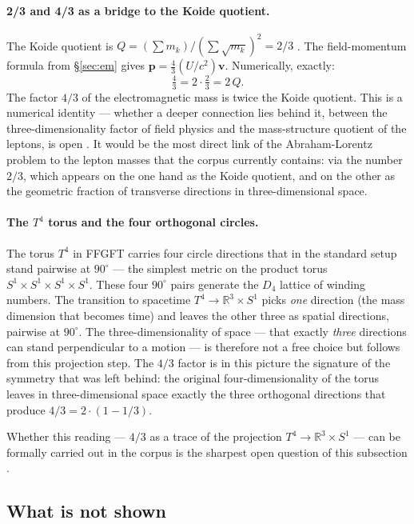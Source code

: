 \paragraph{2/3 and 4/3 as a bridge to the Koide quotient.}
The Koide quotient is $Q = (\sum m_k)/(\sum\sqrt{m_k})^2 = 2/3$ \EM.
The field-momentum formula from \S\ref{sec:em} gives
$\mathbf p = \tfrac{4}{3}(U/c^2)\mathbf v$.
Numerically, exactly:
\[
  \tfrac{4}{3} = 2 \cdot \tfrac{2}{3} = 2\,Q .
\]
The factor $4/3$ of the electromagnetic mass is twice the Koide quotient.
This is a numerical identity --- whether a deeper connection lies behind it,
between the three-dimensionality factor of field physics and the mass-structure
quotient of the leptons, is open \SM. It would be the most direct link of
the Abraham-Lorentz problem to the lepton masses that the corpus currently
contains: via the number $2/3$, which appears on the one hand as the Koide
quotient, and on the other as the geometric fraction of transverse directions
in three-dimensional space.

\paragraph{The $T^4$ torus and the four orthogonal circles.}
The torus $T^4$ in FFGFT carries four circle directions that in the standard
setup stand pairwise at $90^\circ$ --- the simplest metric on the product torus
$S^1\times S^1\times S^1\times S^1$. These four $90^\circ$ pairs generate the
$D_4$ lattice of winding numbers. The transition to spacetime
$T^4 \to \mathbb R^3\times S^1$ picks \emph{one} direction (the mass dimension
that becomes time) and leaves the other three as spatial directions, pairwise at
$90^\circ$. The three-dimensionality of space --- that exactly \emph{three}
directions can stand perpendicular to a motion --- is therefore not a free
choice but follows from this projection step. The $4/3$ factor is in this
picture the signature of the symmetry that was left behind: the original
four-dimensionality of the torus leaves in three-dimensional space exactly the
three orthogonal directions that produce $4/3 = 2\cdot(1-1/3)$.

Whether this reading --- $4/3$ as a trace of the projection $T^4\to\mathbb R^3\times S^1$
--- can be formally carried out in the corpus is the sharpest open question of
this subsection \SM.

\subsection{What is not shown \SM}

